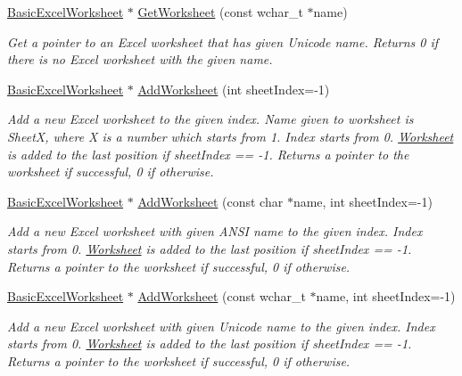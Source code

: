 \begin{DoxyCompactItemize}
\hyperlink{class_y_excel_1_1_basic_excel_worksheet}{Basic\+Excel\+Worksheet} $\ast$ \hyperlink{class_y_excel_1_1_basic_excel_ac457d7532b76c2424290e20f4065221a}{Get\+Worksheet} (const wchar\+\_\+t $\ast$name)
\begin{DoxyCompactList}\small\item\em Get a pointer to an Excel worksheet that has given Unicode name. Returns 0 if there is no Excel worksheet with the given name. \end{DoxyCompactList}\item 
\hyperlink{class_y_excel_1_1_basic_excel_worksheet}{Basic\+Excel\+Worksheet} $\ast$ \hyperlink{class_y_excel_1_1_basic_excel_a82ab7163a7f12bed534234a75e381597}{Add\+Worksheet} (int sheet\+Index=-\/1)
\begin{DoxyCompactList}\small\item\em Add a new Excel worksheet to the given index. Name given to worksheet is Sheet\+X, where X is a number which starts from 1. Index starts from 0. \hyperlink{class_y_excel_1_1_worksheet}{Worksheet} is added to the last position if sheet\+Index == -\/1. Returns a pointer to the worksheet if successful, 0 if otherwise. \end{DoxyCompactList}\item 
\hyperlink{class_y_excel_1_1_basic_excel_worksheet}{Basic\+Excel\+Worksheet} $\ast$ \hyperlink{class_y_excel_1_1_basic_excel_a1bc4925fe7d1885962897531f6163b17}{Add\+Worksheet} (const char $\ast$name, int sheet\+Index=-\/1)
\begin{DoxyCompactList}\small\item\em Add a new Excel worksheet with given A\+N\+S\+I name to the given index. Index starts from 0. \hyperlink{class_y_excel_1_1_worksheet}{Worksheet} is added to the last position if sheet\+Index == -\/1. Returns a pointer to the worksheet if successful, 0 if otherwise. \end{DoxyCompactList}\item 
\hyperlink{class_y_excel_1_1_basic_excel_worksheet}{Basic\+Excel\+Worksheet} $\ast$ \hyperlink{class_y_excel_1_1_basic_excel_a512154ae5f11bdf8440a37c664eb5b76}{Add\+Worksheet} (const wchar\+\_\+t $\ast$name, int sheet\+Index=-\/1)
\begin{DoxyCompactList}\small\item\em Add a new Excel worksheet with given Unicode name to the given index. Index starts from 0. \hyperlink{class_y_excel_1_1_worksheet}{Worksheet} is added to the last position if sheet\+Index == -\/1. Returns a pointer to the worksheet if successful, 0 if otherwise. \end{DoxyCompactList}\item 

\end{DoxyCompactItemize}
